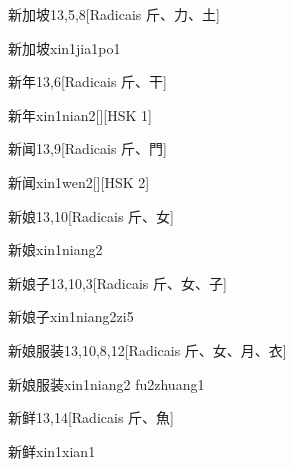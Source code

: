 \begin{entry}{新加坡}{13,5,8}[Radicais ⽄、⼒、⼟]
  \begin{phonetics}{新加坡}{xin1jia1po1}
  \end{phonetics}
\end{entry}

\begin{entry}{新年}{13,6}[Radicais ⽄、⼲]
  \begin{phonetics}{新年}{xin1nian2}[][HSK 1]
  \end{phonetics}
\end{entry}

\begin{entry}{新闻}{13,9}[Radicais ⽄、⾨]
  \begin{phonetics}{新闻}{xin1wen2}[][HSK 2]
  \end{phonetics}
\end{entry}

\begin{entry}{新娘}{13,10}[Radicais ⽄、⼥]
  \begin{phonetics}{新娘}{xin1niang2}
  \end{phonetics}
\end{entry}

\begin{entry}{新娘子}{13,10,3}[Radicais ⽄、⼥、⼦]
  \begin{phonetics}{新娘子}{xin1niang2zi5}
  \end{phonetics}
\end{entry}

\begin{entry}{新娘服装}{13,10,8,12}[Radicais ⽄、⼥、⽉、⾐]
  \begin{phonetics}{新娘服装}{xin1niang2 fu2zhuang1}
  \end{phonetics}
\end{entry}

\begin{entry}{新鲜}{13,14}[Radicais ⽄、⿂]
  \begin{phonetics}{新鲜}{xin1xian1}
  \end{phonetics}
\end{entry}

